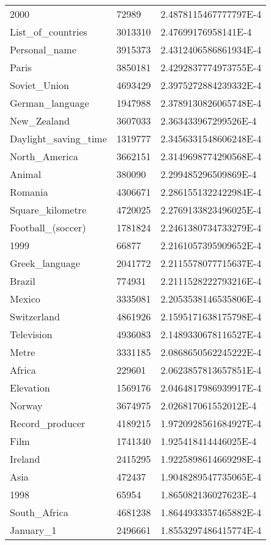\documentclass[a4paper]{article}
\begin{document}
\begin{center}
\begin{longtable}{|l|l|l|}
2000 & 72989 & 2.4878115467777797E-4 \\
List\_of\_countries & 3013310 & 2.47699176958141E-4 \\
Personal\_name & 3915373 & 2.4312406586861934E-4 \\
Paris & 3850181 & 2.4292837774973755E-4 \\
Soviet\_Union & 4693429 & 2.3975272884239332E-4 \\
German\_language & 1947988 & 2.3789130826065748E-4 \\
New\_Zealand & 3607033 & 2.363433967299526E-4 \\
Daylight\_saving\_time & 1319777 & 2.3456331548606248E-4 \\
North\_America & 3662151 & 2.3149698774290568E-4 \\
Animal & 380090 & 2.299485296509869E-4 \\
Romania & 4306671 & 2.2861551322422984E-4 \\
Square\_kilometre & 4720025 & 2.2769133823496025E-4 \\
Football\_(soccer) & 1781824 & 2.2461380734733279E-4 \\
1999 & 66877 & 2.2161057395909652E-4 \\
Greek\_language & 2041772 & 2.2115578077715637E-4 \\
Brazil & 774931 & 2.2111528222793216E-4 \\
Mexico & 3335081 & 2.2053538146535806E-4 \\
Switzerland & 4861926 & 2.1595171638175798E-4 \\
Television & 4936083 & 2.1489330678116527E-4 \\
Metre & 3331185 & 2.0868650562245222E-4 \\
Africa & 229601 & 2.0623857813657851E-4 \\
Elevation & 1569176 & 2.0464817986939917E-4 \\
Norway & 3674975 & 2.026817061552012E-4 \\
Record\_producer & 4189215 & 1.9720928561684927E-4 \\
Film & 1741340 & 1.925418414446025E-4 \\
Ireland & 2415295 & 1.9225898614669298E-4 \\
Asia & 472437 & 1.9048289547735065E-4 \\
1998 & 65954 & 1.865082136027623E-4 \\
South\_Africa & 4681238 & 1.8644933357465882E-4 \\
January\_1 & 2496661 & 1.8553297486415774E-4 \\

\end{longtable}
\end{center}
\end{document}
